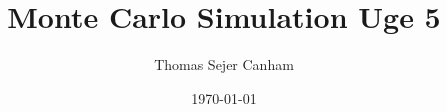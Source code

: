 \documentclass{article}
\title{Monte Carlo Simulation Uge 5}
\author{Thomas Sejer Canham}
\date{\today}
\theoremstyle{definition}
\theoremstyle{remark}
\begin{document}

\begin{titlepage}

    \maketitle
    \thispagestyle{empty}

\end{titlepage}
\end{document}
